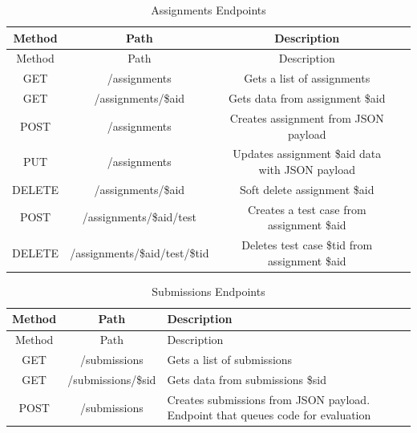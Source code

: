 \setlength{\extrarowheight}{1.5pt}
    \begin{longtable}{|c|c|c|c|}
 \caption{Assignments Endpoints\label{tab:assignmentsends}} \\
     \hline
    
    \centering  Method & Path & Description \\
    \hline \hline \endfirsthead
    
         \hline

    \centering  Method & Path & Description \\
    \hline \hline \endhead
    
    \endfoot 
    GET   & /assignments & {Gets a list of assignments} \\ \hline
    GET   & /assignments/\$aid & {Gets data from assignment \$aid} \\ \hline
    POST  & /assignments & {Creates assignment from JSON payload} \\ \hline
    PUT   & /assignments & {Updates assignment \$aid data with JSON payload} \\ \hline
    DELETE & /assignments/\$aid & {Soft delete assignment \$aid} \\ \hline
    POST  & /assignments/\$aid/test & {Creates a test case from assignment \$aid} \\ \hline
    DELETE & /assignments/\$aid/test/\$tid & {Deletes test case \$tid from assignment \$aid} \\ \hline
\end{longtable}

\setlength{\extrarowheight}{1.5pt}
    \begin{longtable}{|c|c|m{10cm}|}
 \caption{Submissions Endpoints\label{tab:submissionsends}} \\
     \hline
    
    \centering  Method & Path & Description \\
    \hline \hline \endfirsthead
    
         \hline

    \centering  Method & Path & Description \\
    \hline \hline \endhead
    
    \endfoot 
    GET   & /submissions & {Gets a list of submissions} \\ \hline
    GET   & /submissions/\$sid & {Gets data from submissions \$sid} \\ \hline
    POST  & /submissions & {Creates submissions from JSON payload. Endpoint that queues code for evaluation} \\ \hline
\end{longtable}



